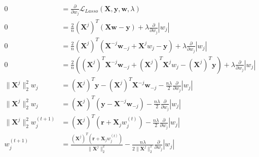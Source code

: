 \newcommand{\matrix}[1]{\mathbf{#1}}
\newcommand{\vector}[1]{\mathbf{#1}}
\newcommand{\X}{\matrix{X}}
\newcommand{\y}{\vector{y}}
\newcommand{\w}{\vector{w}}
\newcommand{\r}{\vector{r}}
\begin{align*}
0 &= \frac{\partial}{\partial w_j} \mathcal{L}_{\textit{Lasso}}(\X,\y,\w, \lambda) \\
0 &= \frac{2}{n} (\X^j)^T (\X\w - \y) + \lambda \frac{\partial}{\partial w_j} |w_j| \\
0 &= \frac{2}{n} (\X^j)^T (\X^{-j} \w_{-j} + \X^j w_j - \y) + \lambda \frac{\partial}{\partial w_j} |w_j| \\
0 &= \frac{2}{n} \left( (\X^j)^T \X^{-j} \w_{-j} + (\X^j)^T \X^j w_j - (\X^j)^T \y \right) + \lambda \frac{\partial}{\partial w_j} |w_j|\\
\|\X^j\|_2^2 w_j &= (\X^j)^T \y - (\X^j)^T \X^{-j} \w_{-j} - \frac{n \lambda}{2} \frac{\partial}{\partial w_j} |w_j|\\
\|\X^j\|_2^2 w_j &= (\X^j)^T (\y -\X^{-j} \w_{-j}) - \frac{n \lambda}{2} \frac{\partial}{\partial w_j} |w_j|\\
\|\X^j\|_2^2 w_j^{(t+1)} &= (\X^j)^T (\r + \X_j w_j^{(t)}) - \frac{n \lambda}{2} \frac{\partial}{\partial w_j} |w_j|\\
w_j^{(t+1)} &= \frac{(\X^j)^T (\r + \X_j w_j^{(t)})}{\|\X^j\|_2^2} - \frac{n \lambda}{2\|\X^j\|_2^2} \frac{\partial}{\partial w_j} |w_j| \\
\end{align*}
